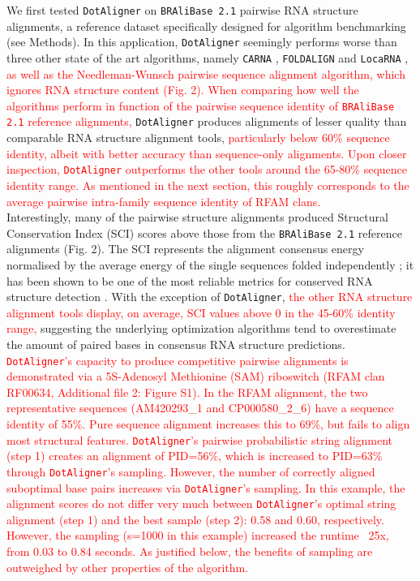 \documentclass{bmcart}
\newcommand\dotaligner{\texttt{DotAligner}}
\newcommand\bralibase{\texttt{BRAliBase 2.1}}
\newcommand\locarna{\texttt{LocaRNA}}
\newcommand\foldalign{\texttt{FOLDALIGN}}
\newcommand\carna{\texttt{CARNA}}
\begin{document}
We first tested \dotaligner{} on \bralibase{} pairwise RNA structure alignments, a reference 
dataset specifically designed for algorithm benchmarking 
\cite{Gardner15860779,wilm2006enhanced} (see Methods). In this application, \dotaligner{} seemingly  
performs worse than three other state of the art algorithms, namely \carna{} \cite{Sorescu2012}, \foldalign{} \cite{havgaard2007fast,sundfeld2015foldalign} and \locarna{} \cite{Will17432929}, \textcolor{red}{ as well as the Needleman-Wunsch pairwise sequence alignment algorithm, which ignores RNA structure content (Fig. 2).
When comparing how well the algorithms perform in function of the pairwise 
sequence identity of \bralibase{} reference alignments, }
\dotaligner{} produces alignments of lesser quality than comparable 
RNA structure alignment tools,\textcolor{red}{ particularly below 60\% sequence identity, 
albeit with better accuracy than sequence-only alignments. 
Upon closer inspection, \dotaligner{} outperforms the other tools around the 65-80\%
sequence identity range. As mentioned in the next section, this roughly corresponds to the 
average pairwise intra-family sequence identity of RFAM clans.}\\

Interestingly, many of the pairwise structure alignments produced Structural 
Conservation Index (SCI) scores above those from the \bralibase{} reference alignments 
(Fig. 2). The SCI represents the alignment consensus energy normalised
 by the average energy of the single sequences folded independently \cite{washietl2005fast}; 
it has been shown to be one of the most reliable metrics for conserved RNA structure 
detection \cite{gruber2008strategies}. With the exception of \dotaligner{}, 
\textcolor{red}{
the other  RNA structure alignment tools display, on average, SCI values above 0 in the 45-60\% identity range, } 
suggesting the underlying optimization algorithms tend to overestimate the amount of paired bases in consensus RNA structure predictions.\\

\textcolor{red}{
\dotaligner's capacity to produce competitive pairwise alignments is demonstrated 
via a 5S-Adenosyl Methionine (SAM) riboswitch (RFAM clan RF00634, Additional file 2: Figure S1). 
In the RFAM alignment, the two representative sequences (AM420293\_1 and CP000580\_2\_6) 
have a sequence identity of 55\%. Pure sequence alignment increases this to 69\%, 
but fails to align most structural features. 
\dotaligner's pairwise probabilistic string alignment (step 1) creates an alignment of PID=56\%, which is increased to PID=63\% through \dotaligner's sampling.
However, the number of correctly aligned suboptimal base pairs increases via \dotaligner{}'s sampling. In this example, the alignment scores do not differ very much between \dotaligner{}'s optimal string alignment (step 1) and the best sample (step 2): 0.58 and 0.60, respectively. However, the sampling (s=1000 in this example) increased the runtime ~25x, from 0.03 to 0.84 seconds. As justified below, the benefits of sampling are outweighed by other properties of the algorithm. \\ 
}
\end{document}

